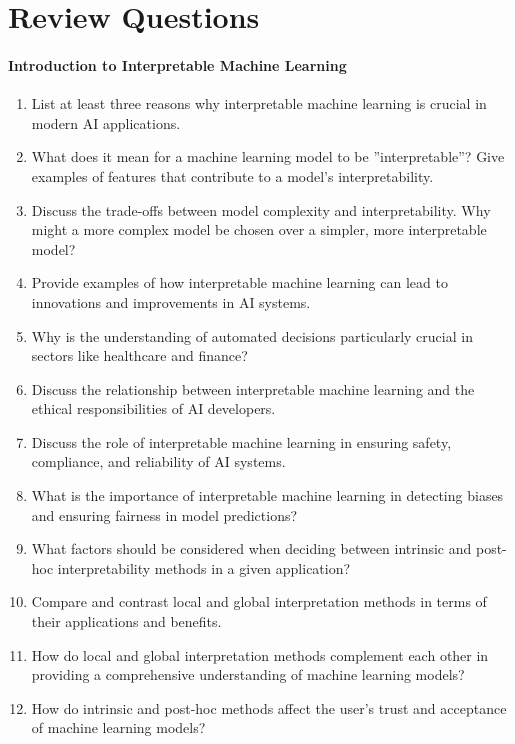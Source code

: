 \FloatBarrier
\section{Review Questions}
\paragraph*{Introduction to Interpretable Machine Learning}
\begin{enumerate}[nosep]
    \item List at least three reasons why interpretable machine learning is crucial in modern AI applications.
    \item What does it mean for a machine learning model to be ''interpretable''? Give examples of features that contribute to a model's interpretability.
    \item Discuss the trade-offs between model complexity and interpretability. Why might a more complex model be chosen over a simpler, more interpretable model?
    \item Provide examples of how interpretable machine learning can lead to innovations and improvements in AI systems.
    \item Why is the understanding of automated decisions particularly crucial in sectors like healthcare and finance?
    \item Discuss the relationship between interpretable machine learning and the ethical responsibilities of AI developers.
    \item Discuss the role of interpretable machine learning in ensuring safety, compliance, and reliability of AI systems.
    \item What is the importance of interpretable machine learning in detecting biases and ensuring fairness in model predictions?
    \item What factors should be considered when deciding between intrinsic and post-hoc interpretability methods in a given application?
    \item Compare and contrast local and global interpretation methods in terms of their applications and benefits.
    \item How do local and global interpretation methods complement each other in providing a comprehensive understanding of machine learning models?
    \item How do intrinsic and post-hoc methods affect the user's trust and acceptance of machine learning models?
\end{enumerate}
